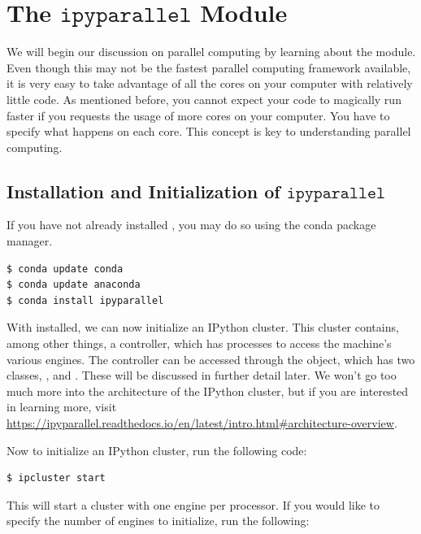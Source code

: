 \section*{The $\texttt{ipyparallel}$ Module}
We will begin our discussion on parallel computing by learning about the  module. Even though this may not be the fastest parallel computing framework available, it is very easy to take advantage of all the cores on your computer with relatively little code. As mentioned before, you cannot expect your code to magically run faster if you requests the usage of more cores on your computer. You have to specify what happens on each core. This concept is key to understanding parallel computing.

\subsection*{Installation and Initialization of $\texttt{ipyparallel}$}

If you have not already installed , you may do so using the conda package manager.

\begin{lstlisting}
$ conda update conda
$ conda update anaconda
$ conda install ipyparallel
\end{lstlisting}

With  installed, we can now initialize an IPython cluster. 
This cluster contains, among other things, a controller, which has processes to access the machine's various engines.
The controller can be accessed through the  object, which has two classes, , and .
These will be discussed in further detail later.
We won't go too much more into the architecture of the IPython cluster, but if you are interested in learning more, visit \url{https://ipyparallel.readthedocs.io/en/latest/intro.html#architecture-overview}.

Now to initialize an IPython cluster, run the following code:

\begin{lstlisting}
$ ipcluster start
\end{lstlisting}


This will start a cluster with one engine per processor. If you would like to specify the number of engines to initialize, run the following:


